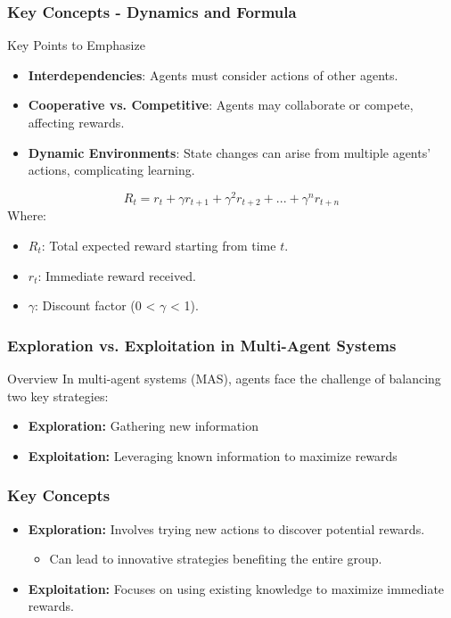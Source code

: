 \documentclass[aspectratio=169]{beamer}
\begin{document}
\begin{frame}[fragile]
    \frametitle{Key Concepts - Dynamics and Formula}
    \begin{block}{Key Points to Emphasize}
        \begin{itemize}
            \item \textbf{Interdependencies}: Agents must consider actions of other agents.
            \item \textbf{Cooperative vs. Competitive}: Agents may collaborate or compete, affecting rewards.
            \item \textbf{Dynamic Environments}: State changes can arise from multiple agents' actions, complicating learning.
        \end{itemize}
    \end{block}

    \begin{equation}
        R_t = r_t + \gamma r_{t+1} + \gamma^2 r_{t+2} + ... + \gamma^n r_{t+n}
    \end{equation}
    Where:
    \begin{itemize}
        \item \( R_t \): Total expected reward starting from time \( t \).
        \item \( r_t \): Immediate reward received.
        \item \( \gamma \): Discount factor (0 < \( \gamma \) < 1).
    \end{itemize}
\end{frame}

\begin{frame}[fragile]
    \frametitle{Exploration vs. Exploitation in Multi-Agent Systems}
    \begin{block}{Overview}
        In multi-agent systems (MAS), agents face the challenge of balancing two key strategies:
        \begin{itemize}
            \item \textbf{Exploration:} Gathering new information
            \item \textbf{Exploitation:} Leveraging known information to maximize rewards
        \end{itemize}
    \end{block}
\end{frame}

\begin{frame}[fragile]
    \frametitle{Key Concepts}
    \begin{itemize}
        \item \textbf{Exploration:} Involves trying new actions to discover potential rewards. 
        \begin{itemize}
            \item Can lead to innovative strategies benefiting the entire group.
        \end{itemize}
        
        \item \textbf{Exploitation:} Focuses on using existing knowledge to maximize immediate rewards.
    \end{itemize}
\end{frame}
\end{document}

